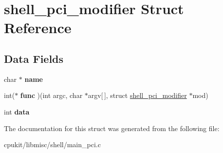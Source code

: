 \hypertarget{structshell__pci__modifier}{}\section{shell\+\_\+pci\+\_\+modifier Struct Reference}
\label{structshell__pci__modifier}
\subsection*{Data Fields}
\begin{DoxyCompactItemize}
\item 
\mbox{\label{structshell__pci__modifier_a27afd82107412419fe59f50cd711402d}} 
char $\ast$ {\bfseries name}
\item 
\mbox{\label{structshell__pci__modifier_a50bc3a5eb7498bec093121b3b26de33d}} 
int($\ast$ {\bfseries func} )(int argc, char $\ast$argv\mbox{[}$\,$\mbox{]}, struct \mbox{\hyperlink{structshell__pci__modifier}{shell\+\_\+pci\+\_\+modifier}} $\ast$mod)
\item 
\mbox{\label{structshell__pci__modifier_a87923addd227d20550ad823ad630f200}} 
int {\bfseries data}
\end{DoxyCompactItemize}


The documentation for this struct was generated from the following file\+:\begin{DoxyCompactItemize}
\item 
cpukit/libmisc/shell/main\+\_\+pci.\+c\end{DoxyCompactItemize}
